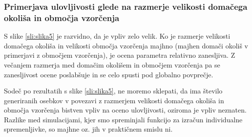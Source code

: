 \subsubsection[\bfseries Primerjava ulovljivosti glede na razmerje velikosti domačega okoliša in območja vzorčenja]{Primerjava ulovljivosti glede na razmerje velikosti domačega okoliša in območja vzorčenja}
S slike \ref{sli:slika5} je razvidno, da je vpliv zelo velik. Ko je razmerje velikosti domačega okoliša in velikosti območja vzorčenja majhno (majhen domači okoliš v primerjavi z območjem vzorčenja), je ocena parametra relativno zanesljiva. Z večanjem razmerja med domačim okolišem in območjem vzorčenja pa se zanesljivost ocene poslabšuje in se celo spusti pod globalno povprečje.

Sodeč po rezultatih s slike \ref{sli:slika5}, ne moremo sklepati, da ima število generiranih osebkov v povezavi z razmerjem velikosti domačega okoliša in območja vzorčenja bistven vpliv na oceno ulovljivosti, oziroma je vpliv neznaten. Razlike med simulacijami, kjer smo spreminjali funkcijo za izračun individualne spremenljivke, so majhne oz. jih v praktičnem smislu ni.

